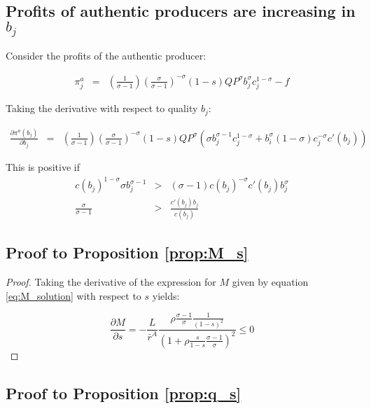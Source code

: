 \documentclass[12pt]{article}
\begin{document}
\subsection{Profits of authentic producers are increasing in $b_j$} \label{proof:auth_profits}

Consider the profits of the authentic producer:

\begin{eqnarray*}
   \pi_j^a& =& \left(\frac{1}{\sigma - 1} \right) \left( \frac{\sigma}{\sigma - 1} \right)^{-\sigma} (1-s) Q P^{\sigma} b_j^{\sigma} c_j^{1-\sigma} - f
\end{eqnarray*}

Taking the derivative with respect to quality $b_j$:

\begin{eqnarray*}
\frac{\partial  \pi^a (b_j)}{\partial b_j}&=&\left(\frac{1}{\sigma - 1} \right) \left( \frac{\sigma}{\sigma - 1} \right)^{-\sigma} (1-s) Q P^{\sigma}\left( \sigma b_j^{\sigma - 1}c_j^{1-\sigma} +b_i^{\sigma}  ({1-\sigma})c_j^{-\sigma} c'(b_j) \right)
\end{eqnarray*}

This is positive if
\begin{eqnarray*}
    c(b_j)^{1-\sigma}\sigma b_j^{\sigma-1}&>&(\sigma-1) c(b_j)^{-\sigma}c'(b_j) b_j^{\sigma} \\
     \frac{\sigma}{\sigma-1}  &>& \frac{c'(b_j)b_j}{c(b_j)} 
\end{eqnarray*}


\subsection{Proof to Proposition \ref{prop:M_s}}
\begin{proof} 
Taking the derivative of the  expression for $M$ given by equation \eqref{eq:M_solution} with respect to $s$ yields:

\begin{equation*}
\frac{\partial M}{\partial s} = - \frac{L}{\bar{r}^A}  \frac{\rho \frac{\sigma - 1}{\sigma} \frac{1}{(1-s)^2} }{\left( 1+\rho \frac{s}{1-s}  \frac{\sigma - 1}{\sigma}  \right)^2} \leq 0
\end{equation*}

\end{proof}

\subsection{Proof to Proposition  \ref{prop:q_s}}
\end{document}
